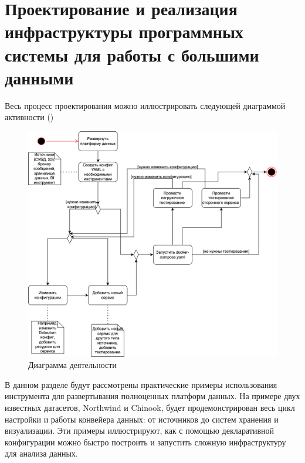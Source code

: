 \chapter{Проектирование и реализация инфраструктуры программных системы для работы с большими данными} \label{ch4}


Весь процесс проектирования можно иллюстрировать следующей диаграммой активности ()

\begin{figure}
  \center
  \includegraphics [scale=0.3] {my_folder/images/diagram_activity}
  \caption{Диаграмма деятельности}
  \label{fig:diagram_activity}
\end{figure}
\FloatBarrier
В данном разделе будут рассмотрены практические примеры использования инструмента для развертывания полноценных платформ данных. На примере двух известных датасетов, Northwind\cite{northwind} и Chinook\cite{chinook}, будет продемонстрирован весь цикл настройки и работы конвейера данных: от источников до систем хранения и визуализации. Эти примеры иллюстрируют, как с помощью декларативной конфигурации можно быстро построить и запустить сложную инфраструктуру для анализа данных.



